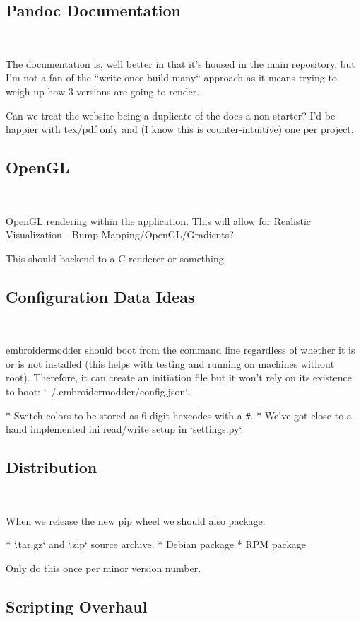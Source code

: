 \documentclass[a4paper]{report}
\begin{document}
{{{{{{\subsection{Pandoc Documentation}
~~~~~~~~~~~~~~~~~~~~~~~~~~~~~~~~~~~~~~

The documentation is, well better in that it's housed in the main repository,
but I'm not a fan of the ``write once build many`` approach as it means
trying to weigh up how 3 versions are going to render.

Can we treat the website being a duplicate of the docs a non-starter?
I'd be happier with tex/pdf only and (I know this is counter-intuitive) one
per project.

\subsection{OpenGL}
~~~~~~~~~~~~~~~~~~~~~~~~~~~~~~~~~~~~~~

OpenGL rendering within the application. This will allow for
Realistic Visualization - Bump Mapping/OpenGL/Gradients?

This should backend to a C renderer or something.

\subsection{Configuration Data Ideas}
~~~~~~~~~~~~~~~~~~~~~~~~~~~~~~~~~~~~~~

embroidermodder should boot from the command line
regardless of whether it is or is not installed (this helps with testing and
running on machines without root). Therefore, it can create an initiation file
but it won't rely on its existence to boot: `~/.embroidermodder/config.json`.

* Switch colors to be stored as 6 digit hexcodes with a \texttt{\#}.
* We've got close to a hand implemented ini read/write setup in `settings.py`.

\subsection{Distribution}
~~~~~~~~~~~~~~~~~~~~~~~~~~~~~~~~~~~~~~

When we release the new pip wheel we should also package:

* `.tar.gz` and `.zip` source archive.
* Debian package
* RPM package

Only do this once per minor version number.

\subsection{Scripting Overhaul}
~~~~~~~~~~~~~~~~~~~~~~~~~~~~~~~~~~~~~~

}}}}}}
\end{document}

